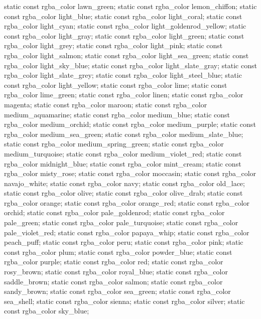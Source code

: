 \begin{codeblock}
{{    static const rgba_color lawn_green;
    static const rgba_color lemon_chiffon;
    static const rgba_color light_blue;
    static const rgba_color light_coral;
    static const rgba_color light_cyan;
    static const rgba_color light_goldenrod_yellow;
    static const rgba_color light_gray;
    static const rgba_color light_green;
    static const rgba_color light_grey;
    static const rgba_color light_pink;
    static const rgba_color light_salmon;
    static const rgba_color light_sea_green;
    static const rgba_color light_sky_blue;
    static const rgba_color light_slate_gray;
    static const rgba_color light_slate_grey;
    static const rgba_color light_steel_blue;
    static const rgba_color light_yellow;
    static const rgba_color lime;
    static const rgba_color lime_green;
    static const rgba_color linen;
    static const rgba_color magenta;
    static const rgba_color maroon;
    static const rgba_color medium_aquamarine;
    static const rgba_color medium_blue;
    static const rgba_color medium_orchid;
    static const rgba_color medium_purple;
    static const rgba_color medium_sea_green;
    static const rgba_color medium_slate_blue;
    static const rgba_color medium_spring_green;
    static const rgba_color medium_turquoise;
    static const rgba_color medium_violet_red;
    static const rgba_color midnight_blue;
    static const rgba_color mint_cream;
    static const rgba_color misty_rose;
    static const rgba_color moccasin;
    static const rgba_color navajo_white;
    static const rgba_color navy;
    static const rgba_color old_lace;
    static const rgba_color olive;
    static const rgba_color olive_drab;
    static const rgba_color orange;
    static const rgba_color orange_red;
    static const rgba_color orchid;
    static const rgba_color pale_goldenrod;
    static const rgba_color pale_green;
    static const rgba_color pale_turquoise;
    static const rgba_color pale_violet_red;
    static const rgba_color papaya_whip;
    static const rgba_color peach_puff;
    static const rgba_color peru;
    static const rgba_color pink;
    static const rgba_color plum;
    static const rgba_color powder_blue;
    static const rgba_color purple;
    static const rgba_color red;
    static const rgba_color rosy_brown;
    static const rgba_color royal_blue;
    static const rgba_color saddle_brown;
    static const rgba_color salmon;
    static const rgba_color sandy_brown;
    static const rgba_color sea_green;
    static const rgba_color sea_shell;
    static const rgba_color sienna;
    static const rgba_color silver;
    static const rgba_color sky_blue;
}}
\end{codeblock}
